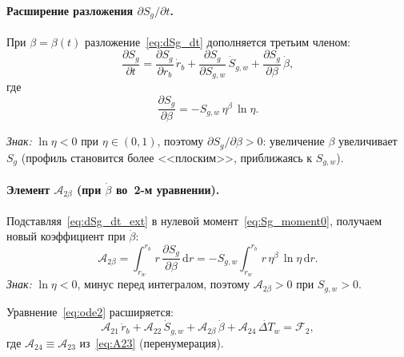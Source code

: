 \documentclass[12pt,a4paper]{article}
\newcommand{\dd}{\mathrm{d}}
\newcommand{\pp}{\partial}
\begin{document}
\paragraph{Расширение разложения $\pp S_g/\pp t$.}
При $\beta = \beta(t)$ разложение~\eqref{eq:dSg_dt}
дополняется третьим членом:
\begin{equation}\label{eq:dSg_dt_ext}
  \frac{\pp S_g}{\pp t}
  = \frac{\pp S_g}{\pp r_b}\,\dot{r}_b
    + \frac{\pp S_g}{\pp S_{g,w}}\,\dot{S}_{g,w}
    + \frac{\pp S_g}{\pp \beta}\,\dot{\beta},
\end{equation}
где
\begin{equation}\label{eq:dSg_dbeta}
  \frac{\pp S_g}{\pp \beta}
  = -S_{g,w}\,\eta^\beta\,\ln\eta.
\end{equation}

\emph{Знак:} $\ln\eta < 0$ при $\eta \in (0,1)$,
поэтому $\pp S_g/\pp\beta > 0$:
увеличение $\beta$ увеличивает $S_g$ (профиль
становится более <<плоским>>, приближаясь к $S_{g,w}$).

\paragraph{Элемент $\mathcal{A}_{2\beta}$ (при $\dot\beta$
во~2-м уравнении).}
Подставляя~\eqref{eq:dSg_dt_ext}
в нулевой момент~\eqref{eq:Sg_moment0},
получаем новый коэффициент при $\dot\beta$:
\begin{equation}\label{eq:A2beta}
  \boxed{
    \mathcal{A}_{2\beta}
    = \int_{r_w}^{r_b} r\,
      \frac{\pp S_g}{\pp\beta}\,\dd r
    = -S_{g,w}\!\int_{r_w}^{r_b}
      r\,\eta^\beta\,\ln\eta\,\dd r.
  }
\end{equation}
\emph{Знак:} $\ln\eta < 0$, минус перед интегралом,
поэтому $\mathcal{A}_{2\beta} > 0$ при $S_{g,w} > 0$.

Уравнение~\eqref{eq:ode2} расширяется:
\begin{equation}\label{eq:ode2_ext}
  \mathcal{A}_{21}\,\dot{r}_b
  + \mathcal{A}_{22}\,\dot{S}_{g,w}
  + \mathcal{A}_{2\beta}\,\dot{\beta}
  + \mathcal{A}_{24}\,\dot{\Delta T}_w
  = \mathcal{F}_2,
\end{equation}
где $\mathcal{A}_{24} \equiv \mathcal{A}_{23}$
из~\eqref{eq:A23} (перенумерация).
\end{document}
